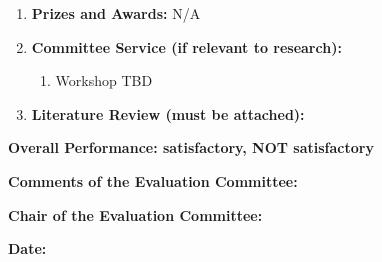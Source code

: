 \documentclass[11pt]{article}
\begin{document}
\begin{enumerate}
        \item \textbf{Prizes and Awards:} N/A

        \item \textbf{Committee Service (if relevant to research):}

        \begin{enumerate}
            \item Workshop TBD
        \end{enumerate}

        \item \textbf{Literature Review  (must be attached):}

    \end{enumerate}

    \bigskip

    \newpage
    \textbf{Overall Performance: \qquad satisfactory\underline{\hspace{20mm}},
    \qquad NOT satisfactory\underline{\hspace{20mm}}}

    \bigskip
    \textbf{Comments of the Evaluation Committee:}

    \bigskip

    \vspace{100mm}


    \textbf{Chair of the  Evaluation Committee:}
    \bigskip

    \textbf{Date:} %
\end{document}

